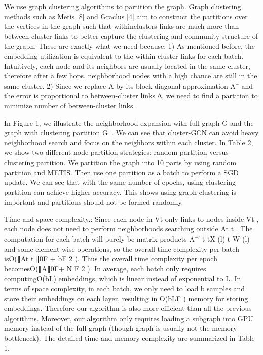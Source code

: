 \documentclass[
]{book}
\begin{document}
{{{We use graph clustering algorithms to partition the graph. Graph clustering methods such as Metis {[}8{]} and Graclus {[}4{]} aim to construct the partitions over the vertices in the graph such that withinclusters links are much more than between-cluster links to better capture the clustering and community structure of the graph. These are exactly what we need because: 1) As mentioned before, the embedding utilization is equivalent to the within-cluster links for each batch. Intuitively, each node and its neighbors are usually located in the same cluster, therefore after a few hops, neighborhood nodes with a high chance are still in the same cluster. 2) Since we replace A by its block diagonal approximation A¯ and the error is proportional to between-cluster links ∆, we need to find a partition to minimize number of between-cluster links.

In Figure 1, we illustrate the neighborhood expansion with full graph G and the graph with clustering partition G¯. We can see that cluster-GCN can avoid heavy neighborhood search and focus on the neighbors within each cluster. In Table 2, we show two different node partition strategies: random partition versus clustering partition. We partition the graph into 10 parts by using random partition and METIS. Then use one partition as a batch to perform a SGD update. We can see that with the same number of epochs, using clustering partition can achieve higher accuracy. This shows using graph clustering is important and partitions should not be formed randomly.

Time and space complexity.: Since each node in Vt only links to nodes inside Vt , each node does not need to perform neighborhoods searching outside At t . The computation for each batch will purely be matrix products A¯′ t tX (l) t W (l) and some element-wise operations, so the overall time complexity per batch isO(∥At t ∥0F + bF 2 ). Thus the overall time complexity per epoch becomesO(∥A∥0F+ N F 2 ). In average, each batch only requires computingO(bL) embeddings, which is linear instead of exponential to L. In terms of space complexity, in each batch, we only need to load b samples and store their embeddings on each layer, resulting in O(bLF ) memory for storing embeddings. Therefore our algorithm is also more efficient than all the previous algorithms. Moreover, our algorithm only requires loading a subgraph into GPU memory instead of the full graph (though graph is usually not the memory bottleneck). The detailed time and memory complexity are summarized in Table 1.

}}}
\end{document}
